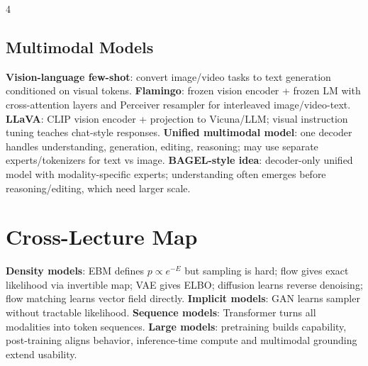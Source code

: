 \documentclass{article}
\newcommand{\key}[1]{\textbf{#1}}
\newcommand{\1}{\mathbf 1}
\begin{document}
\begin{multicols*}{4}
\subsection{Multimodal Models}
\key{Vision-language few-shot}: convert image/video tasks to text generation conditioned on visual tokens. \key{Flamingo}: frozen vision encoder + frozen LM with cross-attention layers and Perceiver resampler for interleaved image/video-text. \key{LLaVA}: CLIP vision encoder + projection to Vicuna/LLM; visual instruction tuning teaches chat-style responses. \key{Unified multimodal model}: one decoder handles understanding, generation, editing, reasoning; may use separate experts/tokenizers for text vs image. \key{BAGEL-style idea}: decoder-only unified model with modality-specific experts; understanding often emerges before reasoning/editing, which need larger scale.

\section{Cross-Lecture Map}
\key{Density models}: EBM defines $p\propto e^{-E}$ but sampling is hard; flow gives exact likelihood via invertible map; VAE gives ELBO; diffusion learns reverse denoising; flow matching learns vector field directly. \key{Implicit models}: GAN learns sampler without tractable likelihood. \key{Sequence models}: Transformer turns all modalities into token sequences. \key{Large models}: pretraining builds capability, post-training aligns behavior, inference-time compute and multimodal grounding extend usability.

\end{multicols*}
\end{document}
